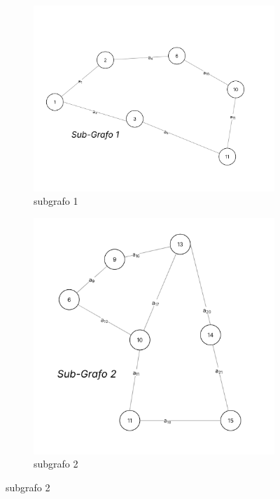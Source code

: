 	\begin{figure}[!htb]
		\centering %
		
		\begin{subfigure}[b]{0.48\textwidth}
			\centering
			\includegraphics[width=\textwidth]{figuras/subgrafos/subgrafo1.png} %
			\caption{subgrafo 1}
			\label{fig:imagem1}
		\end{subfigure}
		\hfill %
		\begin{subfigure}[b]{0.48\textwidth}
			\centering
			\includegraphics[width=\textwidth]{figuras/subgrafos/subgrafo2.png} %
			\caption{subgrafo 2}
			\label{fig:imagem2}
		\end{subfigure}
		

\end{figure}
